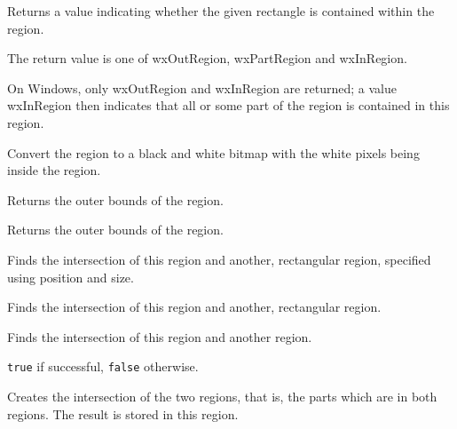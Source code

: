 
Returns a value indicating whether the given rectangle is contained within the region.


The return value is one of wxOutRegion, wxPartRegion and wxInRegion.

On Windows, only wxOutRegion and wxInRegion are returned; a value wxInRegion then indicates that
all or some part of the region is contained in this region.


\label{wxregionconverttobitmap}


Convert the region to a black and white bitmap with the white pixels
being inside the region.


\label{wxregiongetbox}


Returns the outer bounds of the region.


Returns the outer bounds of the region.


\label{wxregionintersect}


Finds the intersection of this region and another, rectangular region, specified using position and size.


Finds the intersection of this region and another, rectangular region.


Finds the intersection of this region and another region.


{\tt true} if successful, {\tt false} otherwise.


Creates the intersection of the two regions, that is, the parts which are in both regions. The result
is stored in this region.


